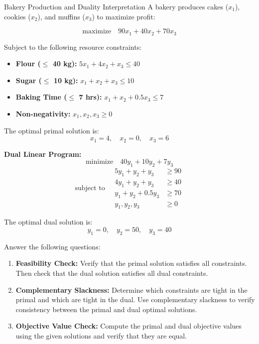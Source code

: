 \begin{ex}{Bakery Production and Duality Interpretation}{}
\label{ex:cs-bakery-duality}
 A bakery produces cakes ($x_1$), cookies ($x_2$), and muffins ($x_3$) to maximize profit:

\[
\text{maximize} \quad 90x_1 + 40x_2 + 70x_3
\]

Subject to the following resource constraints:
\begin{itemize}
  \item \textbf{Flour ($\leq$ 40 kg):} \quad $5x_1 + 4x_2 + x_3 \leq 40$
  \item \textbf{Sugar ($\leq$ 10 kg):} \quad $x_1 + x_2 + x_3 \leq 10$
  \item \textbf{Baking Time ($\leq$ 7 hrs):} \quad $x_1 + x_2 + 0.5x_3 \leq 7$
  \item \textbf{Non-negativity:} \quad $x_1, x_2, x_3 \geq 0$
\end{itemize}

The optimal primal solution is:
\[
x_1 = 4, \quad x_2 = 0, \quad x_3 = 6
\]

\textbf{Dual Linear Program:}
\[
\text{minimize} \quad 40y_1 + 10y_2 + 7y_3
\]
\[
\text{subject to} \quad
\begin{aligned}
5y_1 + y_2 + y_3 &\geq 90 \\
4y_1 + y_2 + y_3 &\geq 40 \\
y_1 + y_2 + 0.5y_3 &\geq 70 \\
y_1, y_2, y_3 &\geq 0
\end{aligned}
\]

The optimal dual solution is:
\[
y_1 = 0, \quad y_2 = 50, \quad y_3 = 40
\]

Answer the following questions:

\begin{enumerate}
  \item \textbf{Feasibility Check:}  
  Verify that the primal solution satisfies all constraints. Then check that the dual solution satisfies all dual constraints.

  \item \textbf{Complementary Slackness:}  
  Determine which constraints are tight in the primal and which are tight in the dual. Use complementary slackness to verify consistency between the primal and dual optimal solutions.

  \item \textbf{Objective Value Check:}  
  Compute the primal and dual objective values using the given solutions and verify that they are equal.


\end{enumerate}
\end{ex}
